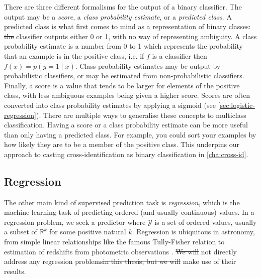 \documentclass[11pt, a4paper]{book}
\newcommand{\defn}[1]{\emph{#1}}
\providecommand{\DIFaddtex}[1]{{\protect\color{blue}\uwave{#1}}} %
\providecommand{\DIFdeltex}[1]{{\protect\color{red}\sout{#1}}}                      %
\providecommand{\DIFaddbegin}{} %
\providecommand{\DIFaddend}{} %
\providecommand{\DIFdelbegin}{} %
\providecommand{\DIFdelend}{} %
\providecommand{\DIFadd}[1]{\texorpdfstring{\DIFaddtex{#1}}{#1}} %
\providecommand{\DIFdel}[1]{\texorpdfstring{\DIFdeltex{#1}}{}} %
\newcommand{\DIFscaledelfig}{0.5}
\newlength{\DIFdelgraphicswidth} %
\newlength{\DIFdelgraphicsheight} %
\newcommand{\DIFaddincludegraphics}[2][]{{\color{blue}\fbox{\DIFOincludegraphics[#1]{#2}}}} %
\newcommand{\DIFdelincludegraphics}[2][]{%
\sbox{\DIFdelgraphicsbox}{\DIFOincludegraphics[#1]{#2}}%
\settoboxwidth{\DIFdelgraphicswidth}{\DIFdelgraphicsbox} %
\settoboxtotalheight{\DIFdelgraphicsheight}{\DIFdelgraphicsbox} %
\scalebox{\DIFscaledelfig}{%
\parbox[b]{\DIFdelgraphicswidth}{\usebox{\DIFdelgraphicsbox}\\[-\baselineskip] \rule{\DIFdelgraphicswidth}{0em}}\llap{\resizebox{\DIFdelgraphicswidth}{\DIFdelgraphicsheight}{%
\setlength{\unitlength}{\DIFdelgraphicswidth}%
\begin{picture}(1,1)%
\thicklines\linethickness{2pt} %
{\color[rgb]{1,0,0}\put(0,0){\framebox(1,1){}}}%
{\color[rgb]{1,0,0}\put(0,0){\line( 1,1){1}}}%
{\color[rgb]{1,0,0}\put(0,1){\line(1,-1){1}}}%
\end{picture}%
}\hspace*{3pt}}} %
} %
\DeclareRobustCommand{\DIFaddbegin}{\DIFOaddbegin \let\includegraphics\DIFaddincludegraphics} %
\DeclareRobustCommand{\DIFaddend}{\DIFOaddend \let\includegraphics\DIFOincludegraphics} %
\DeclareRobustCommand{\DIFdelbegin}{\DIFOdelbegin \let\includegraphics\DIFdelincludegraphics} %
\DeclareRobustCommand{\DIFdelend}{\DIFOaddend \let\includegraphics\DIFOincludegraphics} %
\begin{document}
        There are three different formalisms for the output of a binary classifier. The output may be a \defn{score}, a \defn{class probability estimate}, or a \defn{predicted class}. A predicted class is what first comes to mind as a representation of binary classes: \DIFdelbegin \DIFdel{the }\DIFdelend \DIFaddbegin \DIFadd{The }\DIFaddend classifier outputs either 0 or 1, with no way of representing ambiguity. A class probability estimate is a number from 0 to 1 which represents the probability that an example is in the positive class, i.e. if $f$ is a classifier then $f(x) = p(y = 1 \mid x)$. Class probability estimates may be output by probabilistic classifiers, or may be estimated from non-probabilistic classifiers. Finally, a score is a value that tends to be larger for elements of the positive class, with less ambiguous examples being given a higher score. Scores are often converted into class probability estimates by applying a sigmoid (see \autoref{sec:logistic-regression}). There are multiple ways to generalise these concepts to multiclass classification. Having a score or a class probability estimate can be more useful than only having a predicted class. For example, you could sort your examples by how likely they are to be a member of the positive class. This underpins our approach to casting cross-identification as binary classification in \autoref{cha:cross-id}.

    \subsection{Regression}
    \label{sec:regression}

        The other main kind of supervised prediction task is \defn{regression}, which is the machine learning task of predicting ordered (and usually continuous) values. In a regression problem, we seek a predictor where $\mathcal Y$ is a set of ordered values, usually a subset of $\mathbb R^k$ for some positive natural $k$. Regression is ubiquitous in astronomy, from simple linear relationships like the famous Tully-Fisher relation \citep{tully_new_1977} to estimation of redshifts from photometric observations \citep[called \defn{photometric redshifts}; first introduced by][]{baum_photoelectric_1962}. \DIFdelbegin \DIFdel{We will }\DIFdelend \DIFaddbegin \DIFadd{This thesis does }\DIFaddend not directly address any regression problems\DIFdelbegin \DIFdel{in this thesis, but we will }\DIFdelend \DIFaddbegin \DIFadd{, but does }\DIFaddend make use of their results.
\end{document}
